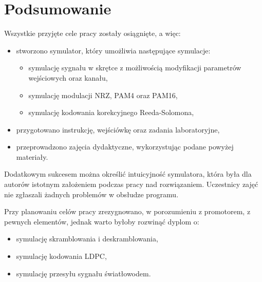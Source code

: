 \section{Podsumowanie}

Wszystkie przyjęte cele pracy zostały osiągnięte, a więc:
\begin{itemize}
    \item stworzono symulator, który umożliwia następujące symulacje:
    \begin{itemize}
        \item symulację sygnału w skrętce z możliwością modyfikacji parametrów wejściowych oraz kanału,
        \item symulację modulacji NRZ, PAM4 oraz PAM16,
        \item symulację kodowania korekcyjnego Reeda-Solomona,
    \end{itemize}
    \item przygotowano instrukcję, wejściówkę oraz zadania laboratoryjne,
    \item przeprowadzono zajęcia dydaktyczne, wykorzystując podane powyżej materiały.
\end{itemize}

Dodatkowym sukcesem można określić intuicyjność symulatora, która była dla autorów istotnym założeniem podczas pracy nad rozwiązaniem. Uczestnicy zajęć nie zgłaszali żadnych problemów w obsłudze programu.

Przy planowaniu celów pracy zrezygnowano, w porozumieniu z promotorem, z pewnych elementów, jednak warto byłoby rozwinąć dyplom o:
\begin{itemize}
    \item symulację skramblowania i deskramblowania,
    \item symulację kodowania LDPC,
    \item symulację przesyłu sygnału światłowodem.
\end{itemize}